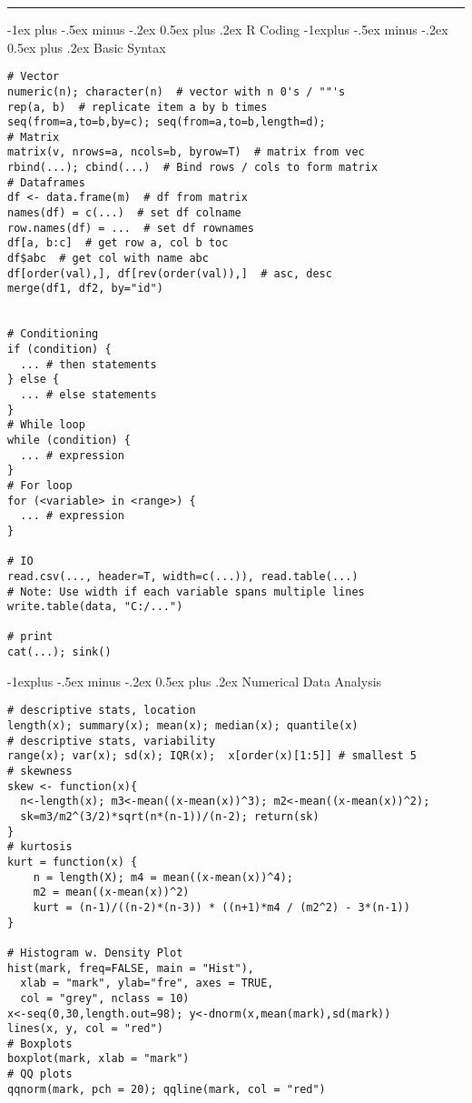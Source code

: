 \documentclass[10pt,landscape,letterpaper]{article}
\makeatletter
\renewcommand{\section}{\@startsection{section}{1}{0mm}%
                                {-1ex plus -.5ex minus -.2ex}%
                                {0.5ex plus .2ex}%
                                {\sffamily\large}}
\renewcommand{\subsection}{\@startsection{subsection}{2}{0mm}%
                                {-1explus -.5ex minus -.2ex}%
                                {0.5ex plus .2ex}%
                                {\sffamily\normalsize\itshape}}
\makeatother
\begin{document}
\begin{multicols}{3}
\noindent\rule{8cm}{0.4pt}
\section{R Coding}
\subsection{Basic Syntax}
\begin{verbatim}
# Vector
numeric(n); character(n)  # vector with n 0's / ""'s
rep(a, b)  # replicate item a by b times
seq(from=a,to=b,by=c); seq(from=a,to=b,length=d);
# Matrix
matrix(v, nrows=a, ncols=b, byrow=T)  # matrix from vec
rbind(...); cbind(...)  # Bind rows / cols to form matrix
# Dataframes
df <- data.frame(m)  # df from matrix
names(df) = c(...)  # set df colname
row.names(df) = ...  # set df rownames
df[a, b:c]  # get row a, col b toc
df$abc  # get col with name abc
df[order(val),], df[rev(order(val)),]  # asc, desc
merge(df1, df2, by="id")


# Conditioning
if (condition) {
  ... # then statements	
} else {
  ... # else statements
}
# While loop
while (condition) {
  ... # expression
}
# For loop
for (<variable> in <range>) {
  ... # expression
}

# IO
read.csv(..., header=T, width=c(...)), read.table(...)
# Note: Use width if each variable spans multiple lines
write.table(data, "C:/...")

# print
cat(...); sink()
\end{verbatim}

\subsection{Numerical Data Analysis}
\begin{verbatim}
# descriptive stats, location
length(x); summary(x); mean(x); median(x); quantile(x)
# descriptive stats, variability
range(x); var(x); sd(x); IQR(x);  x[order(x)[1:5]] # smallest 5
# skewness
skew <- function(x){
  n<-length(x); m3<-mean((x-mean(x))^3); m2<-mean((x-mean(x))^2); 
  sk=m3/m2^(3/2)*sqrt(n*(n-1))/(n-2); return(sk)
} 
# kurtosis
kurt = function(x) {
    n = length(X); m4 = mean((x-mean(x))^4);
    m2 = mean((x-mean(x))^2)
    kurt = (n-1)/((n-2)*(n-3)) * ((n+1)*m4 / (m2^2) - 3*(n-1))
}

# Histogram w. Density Plot
hist(mark, freq=FALSE, main = "Hist"),
  xlab = "mark", ylab="fre", axes = TRUE,
  col = "grey", nclass = 10)
x<-seq(0,30,length.out=98); y<-dnorm(x,mean(mark),sd(mark))
lines(x, y, col = "red")
# Boxplots
boxplot(mark, xlab = "mark")
# QQ plots
qqnorm(mark, pch = 20); qqline(mark, col = "red")


\end{verbatim}
\end{multicols}
\end{document}
